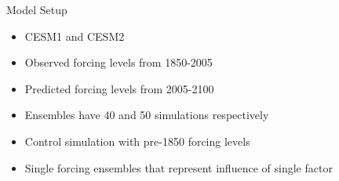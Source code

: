 \documentclass{beamer}
\begin{document}


\begin{frame}{Model Setup}
  \begin{itemize}
  \item CESM1 \citep{kay2015community} and CESM2 \citep{danabasoglu2020community}
  \item Observed forcing levels from 1850-2005
  \item Predicted forcing levels from 2005-2100
  \item Ensembles have 40 and 50 simulations respectively
  \item Control simulation with pre-1850 forcing levels
  \item Single forcing ensembles that represent influence of single factor
  \end{itemize}
\end{frame}
\end{document}
